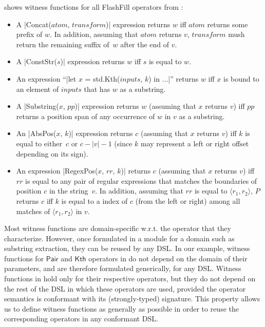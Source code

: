 

\begin{example}
     shows witness functions for all FlashFill operators from :
    \begin{itemize}[nosep]
        \item A \dslinline|Concat($atom$, $transform$)| expression returns $w$ iff $atom$ returns some prefix of $w$.
            In addition, assuming that $atom$ returns $v$, $transform$ mush return the remaining suffix of~$w$ after the
            end of $v$.
        \item A \dslinline|ConstStr($s$)| expression returns $w$ iff $s$ is equal to $w$.
        \item An expression ``\dslinline|let $x$ = std.Kth($inputs$, $k$) in $\dots$|'' returns $w$ iff $x$ is bound to
            an element of $inputs$ that has $w$ as a substring.
        \item A \dslinline|Substring($x$, $pp$)| expression returns $w$ (assuming that $x$ returns $v$) iff $pp$ returns
            a position span of any occurrence of $w$ in $v$ as a substring.
        \item An \dslinline|AbsPos($x$, $k$)| expression returns $c$ (assuming that $x$ returns $v$) iff $k$ is equal to
            either~$c$ or $c-|v|-1$ (since $k$ may represent a left or right offset depending on its sign).
        \item An expression \dslinline|RegexPos($x$, $rr$, $k$)| returns $c$ (assuming that $x$ returns $v$) iff $rr$ is
            equal to any pair of regular expressions that matches the boundaries of position $c$ in the string~$v$.
            In addition, assuming that $rr$ is equal to $\langle r_1, r_2\rangle$, $P$ returns $c$ iff $k$ is equal to
            a index of $c$ (from the left or right) among all matches of $\langle r_1, r_2\rangle$ in $v$.
    \end{itemize}
    \label{ex:wf:flashfill}
\end{example}

Most witness functions are domain-specific w.r.t.  the operator that they characterize.
However, once formulated in a module for a domain such as substring extraction, they can be reused by any DSL.
In our example, witness functions for $\mathsf{Pair}$ and $\mathsf{Kth}$ operators in  do not
depend on the domain of their parameters, and are therefore formulated generically, for any DSL.
Witness functions in  hold only for their respective operators, but they do
not depend on the rest of the DSL in which these operators are used, provided the operator semantics is conformant with
its (strongly-typed) signature.
This property allows us to define witness functions as generally as possible in order to reuse the corresponding
operators in any conformant DSL.
